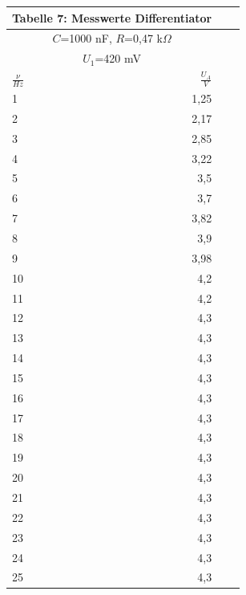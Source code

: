 \documentclass{scrartcl}
\begin{document}
\begin{minipage}{0.6\textwidth}
\begin{tabular}{@{}lr@{}lr@{}}
     \multicolumn{2}{c}{Tabelle 7: Messwerte Differentiator} \\
      \toprule
    \multicolumn{2}{c}{$C$=1000 nF, $R$=0,47 k$\Omega$} \\
     \multicolumn{2}{c}{$U_1$=420 mV} \\
    \cmidrule(r){1-2}
    $\frac{\nu}{Hz}$ & $\frac{U_A}{V}$ \\

    \midrule
	1	& 1,25 \\
	2	& 2,17 \\
	3	& 2,85 \\
    	4	& 3,22 \\
    	5	&  3,5 \\
    	6	& 3,7 \\
    	7	& 3,82 \\
    	8	& 3,9 \\
	9	& 3,98 \\
	10	& 4,2 \\
     	11	& 4,2 \\
     	12	& 4,3 \\
     	13	& 4,3 \\
     	14	& 4,3 \\
     	15	& 4,3 \\
     	16	& 4,3 \\
     	17	& 4,3 \\
     	18	& 4,3 \\
     	19	& 4,3 \\
     	20	& 4,3 \\
     	21	& 4,3 \\
     	22	& 4,3 \\
     	23	& 4,3 \\
     	24	& 4,3 \\
     	25	& 4,3 \\
     \bottomrule
\end{tabular}
\end{minipage}
\fi
\end{document}
